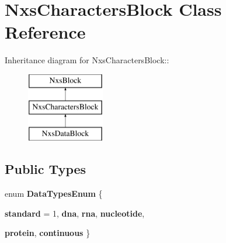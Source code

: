 \hypertarget{classNxsCharactersBlock}{
\section{NxsCharactersBlock Class Reference}
\label{classNxsCharactersBlock}
}
Inheritance diagram for NxsCharactersBlock::\begin{figure}[H]
\begin{center}
\leavevmode
\includegraphics[height=3cm]{classNxsCharactersBlock}
\end{center}
\end{figure}
\subsection*{Public Types}
\begin{DoxyCompactItemize}
\item 
enum {\bfseries DataTypesEnum} \{ \par
{\bfseries standard} =  1, 
{\bfseries dna}, 
{\bfseries rna}, 
{\bfseries nucleotide}, 
\par
{\bfseries protein}, 
{\bfseries continuous}
 \}
\end{DoxyCompactItemize}
